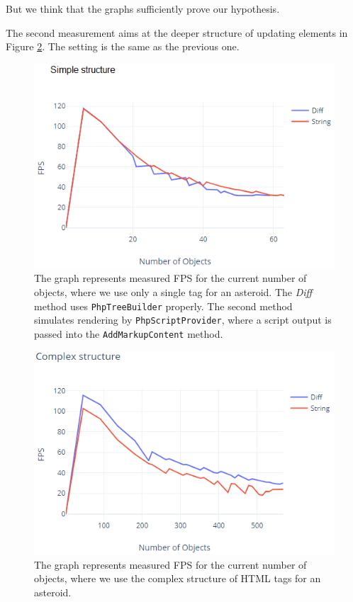 But we think that the graphs sufficiently prove our hypothesis.
\par
The second measurement aims at the deeper structure of updating elements in Figure \ref{img32:benchmark2}.
The setting is the same as the previous one.
\par
\begin{figure}\centering
\includegraphics{./img/graph_1}
\caption{The graph represents measured FPS for the current number of objects, where we use only a single tag for an asteroid. The \textit{Diff} method uses \texttt{PhpTreeBuilder} properly. The second method simulates rendering by \texttt{PhpScriptProvider}, where a script output is passed into the \texttt{AddMarkupContent} method.}
\label{img31:benchmark1}
\end{figure} 
\par
\begin{figure}\centering
\includegraphics{./img/graph_3}
\caption{The graph represents measured FPS for the current number of objects, where we use the complex structure of HTML tags for an asteroid.}
\label{img32:benchmark2}
\end{figure} 
